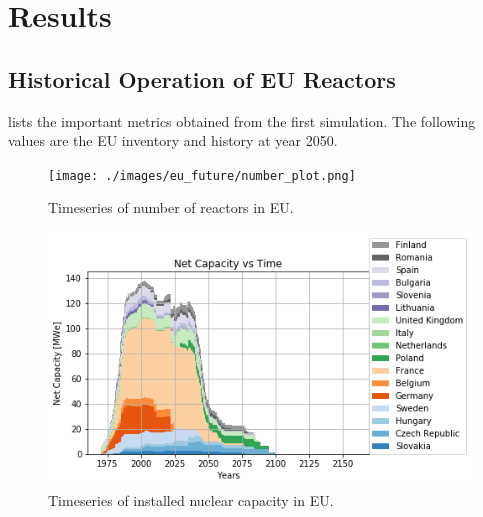 \section{Results}

\subsection{Historical Operation of \gls{EU} Reactors}


\begin{table}[h]
	\centering
		\caption{Simulation Results}
		\label{tab:sim_result}
		\end {table}

 lists the important metrics
obtained from the first simulation. The following
values are the \gls{EU} inventory and history at year 2050.



\begin{figure}[htbp!]
	\begin{center}
		\texttt{[image: ./images/eu\_future/number\_plot.png]}
	\end{center}
	\caption{Timeseries of number of reactors in \gls{EU}.}
	\label{fig:eu_num}
\end{figure}

\begin{figure}[htbp!]
	\begin{center}
		\includegraphics[scale=0.7]{./images/eu_future/power_plot.png}
	\end{center}
	\caption{Timeseries of installed nuclear capacity in \gls{EU}.}
	\label{fig:eu_pow}
\end{figure}
\FloatBarrier

